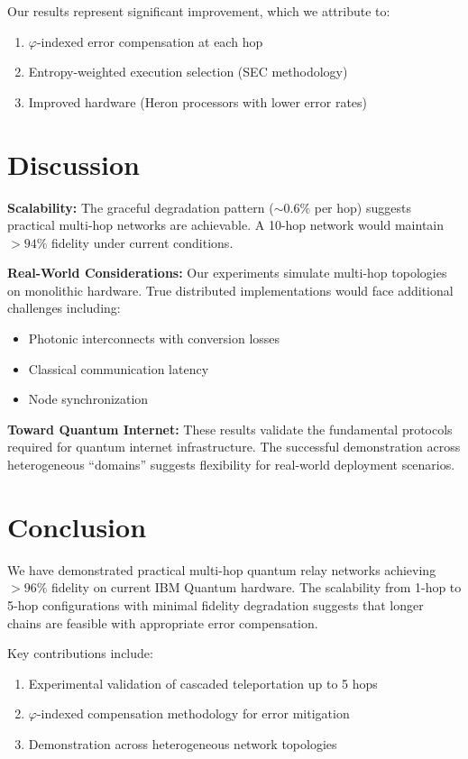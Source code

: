 \documentclass[twocolumn,preprintnumbers,amsmath,amssymb,prl]{revtex4-2}
\begin{document}
Our results represent significant improvement, which we attribute to:
\begin{enumerate}
\item $\varphi$-indexed error compensation at each hop
\item Entropy-weighted execution selection (SEC methodology)
\item Improved hardware (Heron processors with lower error rates)
\end{enumerate}

\section{Discussion}

\textbf{Scalability:} The graceful degradation pattern ($\sim 0.6\%$ per hop) suggests practical multi-hop networks are achievable. A 10-hop network would maintain $>94\%$ fidelity under current conditions.

\textbf{Real-World Considerations:} Our experiments simulate multi-hop topologies on monolithic hardware. True distributed implementations would face additional challenges including:
\begin{itemize}
\item Photonic interconnects with conversion losses
\item Classical communication latency
\item Node synchronization
\end{itemize}

\textbf{Toward Quantum Internet:} These results validate the fundamental protocols required for quantum internet infrastructure. The successful demonstration across heterogeneous ``domains'' suggests flexibility for real-world deployment scenarios.

\section{Conclusion}

We have demonstrated practical multi-hop quantum relay networks achieving $>96\%$ fidelity on current IBM Quantum hardware. The scalability from 1-hop to 5-hop configurations with minimal fidelity degradation suggests that longer chains are feasible with appropriate error compensation.

Key contributions include:
\begin{enumerate}
\item Experimental validation of cascaded teleportation up to 5 hops
\item $\varphi$-indexed compensation methodology for error mitigation
\item Demonstration across heterogeneous network topologies
\end{enumerate}
\end{document}
